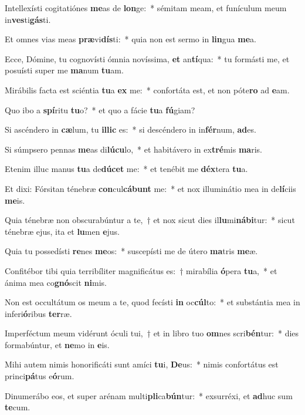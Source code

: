\item Intellexísti cogitatiónes \textbf{me}as de \textbf{lon}ge:~* sémitam meam, et funículum meum in\textbf{ves}ti\textbf{gás}ti.
\item Et omnes vias meas \textbf{præ}vi\textbf{dís}ti:~* quia non est sermo in \textbf{lin}gua \textbf{me}a.
\item Ecce, Dómine, tu cognovísti ómnia novíssima, \textbf{et} an\textbf{tí}qua:~* tu formásti me, et posuísti super me \textbf{ma}num \textbf{tu}am.
\item Mirábilis facta est sciéntia \textbf{tu}a \textbf{ex} me:~* confortáta est, et non póte\textbf{ro} ad \textbf{e}am.
\item Quo ibo a \textbf{spí}ritu \textbf{tu}o?~* et quo a fácie \textbf{tu}a \textbf{fú}giam?
\item Si ascéndero in \textbf{cæ}lum, tu \textbf{il}\textbf{lic} es:~* si descéndero in in\textbf{fér}num, \textbf{ad}es.
\item Si súmpsero pennas \textbf{me}as di\textbf{lú}\textbf{cu}lo,~* et habitávero in ex\textbf{tré}mis \textbf{ma}ris.
\item Etenim illuc manus \textbf{tu}a de\textbf{dú}\textbf{cet} me:~* et tenébit me \textbf{déx}tera \textbf{tu}a.
\item Et dixi: Fórsitan ténebræ \textbf{con}cul\textbf{cá}\textbf{bunt} me:~* et nox illuminátio mea in de\textbf{lí}ciis \textbf{me}is.
\item Quia ténebræ non obscurabúntur a te,~† et nox sicut dies il\textbf{lu}mi\textbf{ná}\textbf{bi}tur:~* sicut ténebræ ejus, ita et \textbf{lu}men \textbf{e}jus.
\item Quia tu possedísti \textbf{re}nes \textbf{me}os:~* suscepísti me de útero \textbf{ma}tris \textbf{me}æ.
\item Confitébor tibi quia terribíliter magnificátus es:~† mirabília \textbf{ó}pera \textbf{tu}a,~* et ánima mea co\textbf{gnó}scit \textbf{ni}mis.
\item Non est occultátum os meum a te, quod fecísti \textbf{in} oc\textbf{cúl}to:~* et substántia mea in inferi\textbf{ó}ribus \textbf{ter}ræ.
\item Imperféctum meum vidérunt óculi tui,~† et in libro tuo \textbf{om}nes scri\textbf{bén}tur:~* dies formabúntur, et \textbf{ne}mo in \textbf{e}is.
\item Mihi autem nimis honorificáti sunt amíci \textbf{tu}i, \textbf{De}us:~* nimis confortátus est princi\textbf{pá}tus e\textbf{ó}rum.
\item Dinumerábo eos, et super arénam multi\textbf{pli}ca\textbf{bún}tur:~* exsurréxi, et \textbf{ad}huc sum \textbf{te}cum.
